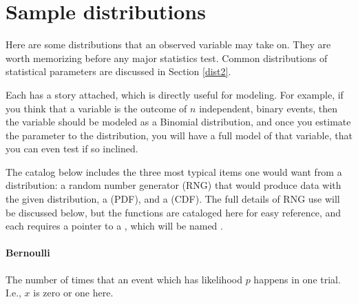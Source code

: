 \section{Sample distributions}
\label{distlist}


Here are some distributions that an observed variable may take on. They are
worth memorizing before any major statistics test. Common distributions
of statistical parameters are discussed in Section \ref{dist2}.

Each has a story attached, which is directly useful for
modeling. For example, if you think that a variable is the outcome of $n$
independent, binary events, then the variable should be modeled as a
Binomial distribution, and once you estimate the parameter to the
distribution, you will have a full model of that variable, that you can
even test if so inclined.

The catalog below includes the three most typical items one would want
from a distribution: a random number generator (RNG) that would produce
data with the given distribution, a  (PDF),
and a  (CDF). The full details of RNG use
will be discussed below, but the functions are cataloged here for easy
reference, and each requires a pointer to a , which will be
named .


\paragraph{Bernoulli}\label{bernie}

The number of times that an event which has likelihood $p$ happens in
one trial. I.e., $x$ is zero or one here.

 

